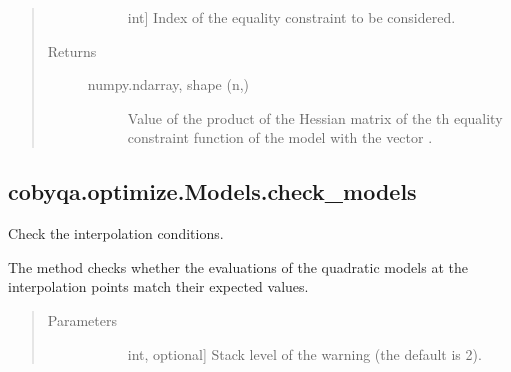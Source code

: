 \documentclass[letterpaper,10pt,english]{sphinxmanual}
\begin{document}
\begin{fulllineitems}
\begin{fulllineitems}
\begin{quote}
\begin{description}
\begin{description}
\item[{}] \leavevmode{[}int{]}
\sphinxAtStartPar
Index of the equality constraint to be considered.

\end{description}

\item[{Returns}] \leavevmode\begin{description}
\item[{numpy.ndarray, shape (n,)}] \leavevmode
\sphinxAtStartPar
Value of the product of the Hessian matrix of the \sphinxhyphen{}th equality
constraint function of the model with the vector .

\end{description}

\end{description}\end{quote}

\end{fulllineitems}



\subsection{cobyqa.optimize.Models.check\_models}
\label{\detokenize{refs/generated/cobyqa.optimize.Models.check_models:cobyqa-optimize-models-check-models}}\label{\detokenize{refs/generated/cobyqa.optimize.Models.check_models::doc}}

\begin{fulllineitems}
\label{\detokenize{refs/generated/cobyqa.optimize.Models.check_models:cobyqa.optimize.Models.check_models}}
\sphinxAtStartPar
Check the interpolation conditions.

\sphinxAtStartPar
The method checks whether the evaluations of the quadratic models at the
interpolation points match their expected values.
\begin{quote}\begin{description}
\item[{Parameters}] \leavevmode\begin{description}
\item[{}] \leavevmode{[}int, optional{]}
\sphinxAtStartPar
Stack level of the warning (the default is 2).


\end{description}
\end{description}
\end{quote}
\end{fulllineitems}
\end{fulllineitems}
\end{document}
